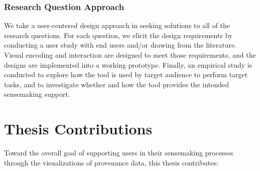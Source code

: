 \subsubsection*{\textbf{Research Question Approach}}
We take a user-centered design approach in seeking solutions to all of the research questions. For each question, we elicit the design requirements by conducting a user study with end users and/or drawing from the literature. Visual encoding and interaction are designed to meet those requirements, and the designs are implemented into a working prototype. Finally, an empirical study is conducted to explore how the tool is used by target audience to perform target tasks, and to investigate whether and how the tool provides the intended sensemaking support. 

\section{Thesis Contributions}
Toward the overall goal of supporting users in their sensemaking processes through the visualizations of provenance data, this thesis contributes:

